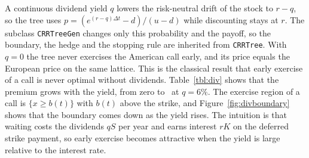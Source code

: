 A continuous dividend yield $q$ lowers the risk-neutral drift of the stock to $r-q$, so the tree uses $p=(e^{(r-q)\Delta t}-d)/(u-d)$ while discounting stays at $r$.
The subclass \texttt{CRRTreeGen} changes only this probability and the payoff, so the boundary, the hedge and the stopping rule are inherited from \texttt{CRRTree}.
With $q=0$ the tree never exercises the American call early, and its price equals the European price on the same lattice.
This is the classical result that early exercise of a call is never optimal without dividends.
Table~\ref{tbl:div} shows that the premium grows with the yield, from zero to \DivPremSix\ at $q=6\%$.
The exercise region of a call is $\{x\ge b(t)\}$ with $b(t)$ above the strike, and Figure~\ref{fig:divboundary} shows that the boundary comes down as the yield rises.
The intuition is that waiting costs the dividends $qS$ per year and earns interest $rK$ on the deferred strike payment, so early exercise becomes attractive when the yield is large relative to the interest rate.
